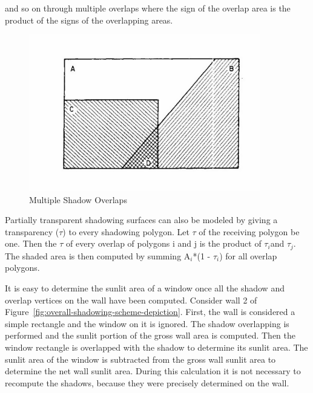 and so on through multiple overlaps where the sign of the overlap area is the product of the signs of the overlapping areas.

\begin{figure}[hbtp] %
\centering
\includegraphics[width=0.9\textwidth, height=0.9\textheight, keepaspectratio=true]{media/image642.png}
\caption{Multiple Shadow Overlaps \protect \label{fig:multiple-shadow-overlaps}}
\end{figure}

Partially transparent shadowing surfaces can also be modeled by giving a transparency ($\tau$) to every shadowing polygon. Let $\tau$ of the receiving polygon be one. Then the $\tau$ of every overlap of polygons i and j is the product of $\tau$\(_{i}\)and $\tau$\(_{j}\). The shaded area is then computed by summing A\(_{i}\)*(1 - $\tau$\(_{i}\)) for all overlap polygons.

It is easy to determine the sunlit area of a window once all the shadow and overlap vertices on the wall have been computed. Consider wall 2 of Figure~\ref{fig:overall-shadowing-scheme-depiction}. First, the wall is considered a simple rectangle and the window on it is ignored. The shadow overlapping is performed and the sunlit portion of the gross wall area is computed. Then the window rectangle is overlapped with the shadow to determine its sunlit area. The sunlit area of the window is subtracted from the gross wall sunlit area to determine the net wall sunlit area. During this calculation it is not necessary to recompute the shadows, because they were precisely determined on the wall.

